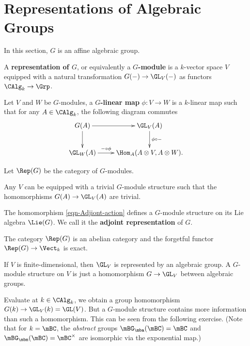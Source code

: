 \section{Representations of Algebraic Groups}

In this section, $G$ is an affine algebraic group.

\begin{defn}
	A \textbf{representation of $G$}, or equivalently a \textbf{$G$-module} is a $k$-vector space $V$ equipped with a natural transformation $G(-)\to \GL_V(-)$ as functors $\CAlg_k \to \Grp$.

	Let $V$ and $W$ be $G$-modules, a \textbf{$G$-linear map} $\phi:V\to W$ is a $k$-linear map such that for any $A\in \CAlg_k$, the following diagram commutes
	\[
		\xymatrix{
			G(A) \ar[r] \ar[d] &
			\GL_V(A) \ar[d]^-{\phi\circ-} \\
			\GL_W(A) \ar[r]^-{-\circ \phi} &
			\Hom_A( A\ot V,A\ot W ).
		}
	\]

	Let $\Rep(G)$ be the category of $G$-modules.
\end{defn}

\begin{exam}
	Any $V$ can be equipped with a trivial $G$-module structure such that the homomorphisms $G(A) \to \GL_V(A)$ are trivial.
\end{exam}

\begin{exam}
	The homomorphism \eqref{eqn-Adjiont-action} defines a $G$-module structure on its Lie algebra $\Lie(G)$. We call it the \textbf{adjoint representation} of $G$.

\end{exam}

\begin{prop}
	The category $\Rep(G)$ is an abelian category and the forgetful functor $\Rep(G)\to \Vect_k$ is exact. 
\end{prop}

\begin{rem}
	If $V$ is finite-dimensional, then $\GL_V$ is represented by an algebraic group. A $G$-module structure on $V$ is just a homomorphism $G\to \GL_V$ between algebraic groups.
\end{rem}

\begin{warn}
	Evaluate at $k\in \CAlg_k$, we obtain a group homomorphism $G(k) \to \GL_V(k)=\GL(V)$. But a $G$-module structure contains more information than such a homomorphism. This can be seen from the following exercise. (Note that for $k=\mBC$, the \emph{abstract} groups $\mBG_\mba(\mBC)=\mBC$ and $\mBG_\mbm(\mBC)=\mBC^\times$ are isomorphic via the exponential map.)
\end{warn}


